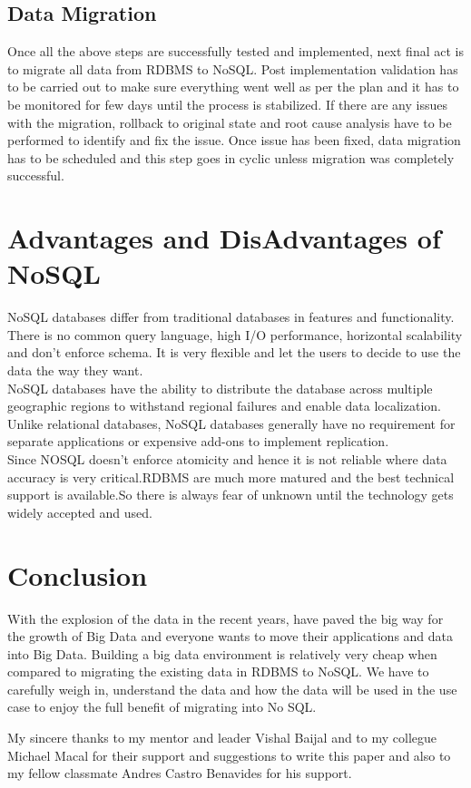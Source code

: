 \documentclass[sigconf]{acmart}
\begin{document}
\subsection{Data Migration} 
Once all the above steps are successfully tested and implemented, next final act is to migrate all data from RDBMS to NoSQL. Post implementation validation has to be carried out to make sure everything went well as per the plan and it has to be monitored for few days until the process is stabilized. If there are any issues with the migration, rollback to original state and root cause analysis have to be performed to identify and fix the issue. Once issue has been fixed, data migration has to be scheduled and this step goes in cyclic unless migration was completely successful. 

\section{Advantages and DisAdvantages of NoSQL}
NoSQL databases differ from traditional databases in features and functionality. There is no common query language, high I/O performance, horizontal scalability and don't enforce schema. It is very flexible and let the users to decide to use the data the way they want.\\
NoSQL databases have the ability to distribute the database across multiple geographic regions to withstand regional failures and enable data localization. Unlike relational databases, NoSQL databases generally have no requirement for separate applications or expensive add-ons to implement replication.\cite{mongo}\\
Since NOSQL doesn't enforce atomicity and hence it is not reliable where data accuracy is very critical.RDBMS are much more matured and the best technical support is available.So there is always fear of unknown until the technology gets widely accepted and used.


\section{Conclusion}
With the explosion of the data in the recent years, have paved the big way for the growth of Big Data and everyone wants to move their applications and data into Big Data. Building a big data environment is relatively very cheap when compared to migrating the existing data in RDBMS to NoSQL. We have to carefully weigh in, understand the data and how the data will be used in the use case to enjoy the full benefit of migrating into No SQL.

\begin{acks}
My sincere thanks to my mentor and leader Vishal Baijal and to my collegue Michael Macal for their support and suggestions to write this paper and also to my fellow classmate Andres Castro Benavides for his support.
\end{acks}



\end{document}
